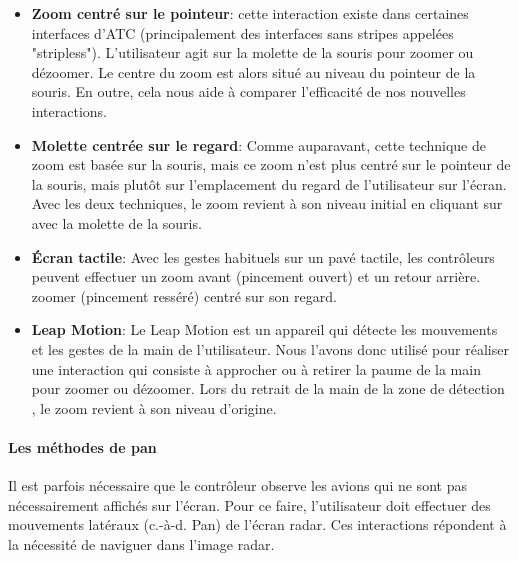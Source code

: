 \begin{itemize}

\item \textbf{Zoom centré sur le pointeur}: cette interaction existe dans certaines interfaces d'ATC (principalement des interfaces sans stripes appelées "stripless"). L'utilisateur agit sur
la molette de la souris pour zoomer ou dézoomer. Le centre du zoom est alors
situé au niveau du pointeur de la souris. En outre, cela nous aide à comparer
l'efficacité de nos nouvelles interactions.

\item \textbf{Molette centrée sur le regard}: Comme auparavant, cette technique de zoom est basée sur la souris, mais
ce zoom n'est plus centré sur le pointeur de la souris, mais
plutôt sur l'emplacement du regard de l'utilisateur sur l'écran. Avec les deux techniques, le zoom revient à son niveau initial en cliquant sur
avec la molette de la souris.

\item \textbf{Écran tactile}: Avec les gestes habituels sur un pavé tactile, les contrôleurs peuvent effectuer un zoom avant (pincement ouvert) et un retour arrière.
zoomer (pincement resséré) centré sur son regard.

\item \textbf{Leap Motion}: Le Leap Motion est un appareil qui détecte les mouvements et
les gestes de la main de l'utilisateur. Nous l'avons donc utilisé pour réaliser
une interaction qui consiste à approcher ou à retirer la paume de
la main pour zoomer ou dézoomer. Lors du retrait de la main
de la zone de détection , le zoom revient à
son niveau d'origine.

\end{itemize}


\paragraph{Les méthodes de pan}
Il est parfois nécessaire que le contrôleur observe les avions qui ne sont pas nécessairement affichés sur l'écran. Pour ce faire, l'utilisateur doit effectuer des mouvements latéraux
(c.-à-d. Pan) de l'écran radar. Ces interactions répondent à
la nécessité de naviguer dans l'image radar.

